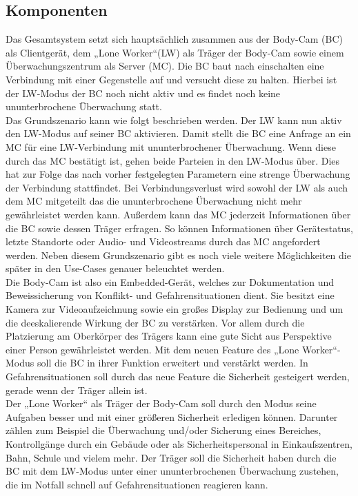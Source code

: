 \documentclass[thesis.tex]{subfiles}
\begin{document}
\subsection{Komponenten}
Das Gesamtsystem setzt sich hauptsächlich zusammen aus der Body-Cam (BC) als Clientgerät, dem „Lone Worker“(LW)
als Träger der Body-Cam sowie einem Überwachungszentrum als Server (MC).
Die BC baut nach einschalten eine Verbindung mit einer Gegenstelle auf und versucht diese zu halten.
Hierbei ist der LW-Modus der BC noch nicht aktiv und es findet noch keine ununterbrochene Überwachung statt.
\\

Das Grundszenario kann wie folgt beschrieben werden. Der LW kann nun aktiv den LW-Modus auf seiner BC aktivieren.
Damit stellt die BC eine Anfrage an ein MC für eine LW-Verbindung mit ununterbrochener Überwachung.
Wenn diese durch das MC bestätigt ist, gehen beide Parteien in den LW-Modus über.
Dies hat zur Folge das nach vorher festgelegten Parametern eine strenge Überwachung der Verbindung stattfindet.
Bei Verbindungsverlust wird sowohl der LW als auch dem MC mitgeteilt das die ununterbrochene Überwachung nicht mehr gewährleistet werden kann.
Außerdem kann das MC jederzeit Informationen über die BC sowie dessen Träger erfragen.
So können Informationen über Gerätestatus, letzte Standorte oder Audio- und Videostreams durch das MC angefordert werden.
Neben diesem Grundszenario gibt es noch viele weitere Möglichkeiten die später in den Use-Cases genauer beleuchtet werden.
\\

Die Body-Cam ist also ein Embedded-Gerät, welches zur Dokumentation und Beweissicherung von Konflikt- und Gefahrensituationen dient.
Sie besitzt eine Kamera zur Videoaufzeichnung sowie ein großes Display zur Bedienung und um die deeskalierende Wirkung der BC zu verstärken.
Vor allem durch die Platzierung am Oberkörper des Trägers kann eine gute Sicht aus Perspektive einer Person gewährleistet werden.
Mit dem neuen Feature des „Lone Worker“-Modus soll die BC in ihrer Funktion erweitert und verstärkt werden.
In Gefahrensituationen soll durch das neue Feature die Sicherheit gesteigert werden, gerade wenn der Träger allein ist.
\\

Der „Lone Worker“ als Träger der Body-Cam soll durch den Modus seine Aufgaben besser und mit einer größeren Sicherheit erledigen können.
Darunter zählen zum Beispiel die Überwachung und/oder Sicherung eines Bereiches, Kontrollgänge durch ein Gebäude oder
als Sicherheitspersonal in Einkaufszentren, Bahn, Schule und vielem mehr.
Der Träger soll die Sicherheit haben durch die BC mit dem LW-Modus unter einer ununterbrochenen Überwachung zustehen,
die im Notfall schnell auf Gefahrensituationen reagieren kann.
\\
\end{document}
